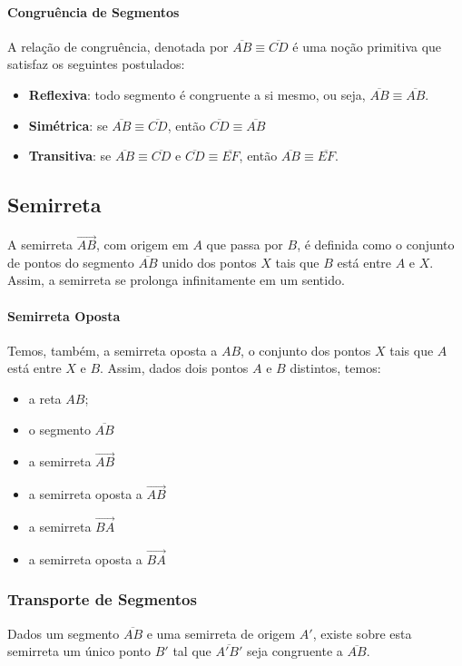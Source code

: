     \paragraph{Congruência de Segmentos}
    A relação de congruência, denotada por $\overline{AB} \equiv \overline{CD}$ é uma noção primitiva que satisfaz os seguintes postulados:
    \begin{itemize}
    \item \textbf{Reflexiva}: todo segmento é congruente a si mesmo, ou seja, $\overline{AB} \equiv \overline{AB}$.
    \item \textbf{Simétrica}: se $\overline{AB} \equiv \overline{CD}$, então $\overline{CD} \equiv \overline{AB}$
    \item \textbf{Transitiva}: se $\overline{AB} \equiv \overline{CD}$ e $\overline{CD} \equiv \overline{EF}$, então $\overline{AB} \equiv \overline{EF}$.
    \end{itemize}
\subsection{Semirreta}
\begin{df}
A semirreta $\overrightarrow{AB}$, com origem em $A$ que passa por $B$, é definida como o conjunto de pontos do segmento $\overline{AB}$ unido dos pontos $X$ tais que $B$ está entre $A$ e $X$. Assim, a semirreta se prolonga infinitamente em um sentido.\par 
\end{df}
\paragraph{Semirreta Oposta} Temos, também, a semirreta oposta a $AB$, o conjunto dos pontos $X$ tais que $A$ está entre $X$ e $B$.
Assim, dados dois pontos $A$ e $B$ distintos, temos:
\begin{itemize}
\item a reta $AB$;
\item o segmento $\overline{AB}$
\item a semirreta $\overrightarrow{AB}$
\item a semirreta oposta a $\overrightarrow{AB}$
\item a semirreta $\overrightarrow{BA}$
\item a semirreta oposta a $\overrightarrow{BA}$
\end{itemize}

\subsubsection{Transporte de Segmentos}
\begin{post}
Dados um segmento $\overline{AB}$ e uma semirreta de origem $A'$, existe sobre esta semirreta um único ponto $B'$ tal que $\overline{A'B'}$ seja congruente a $\overline{AB}$.
\end{post}
